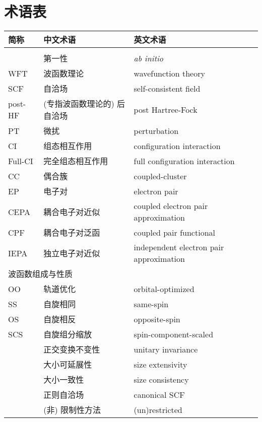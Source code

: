 
\chapter{术语表}

\begingroup
\setlength{\LTleft}{-20cm plus -1fill}
\setlength{\LTright}{\LTleft}

\begin{longtable}{lll}
    \toprule 简称 & 中文术语 & 英文术语 \\ \midrule \endhead
    \bottomrule \endlastfoot
    \multicolumn{3}{l}{\textsf{波函数理论}} \\
    & 第一性 & \emph{ab initio} \\
    WFT & 波函数理论 & wavefunction theory \\
    SCF & 自洽场 & self-consistent field \\
    post-HF & (专指波函数理论的) 后自洽场 & post Hartree-Fock \\
    PT & 微扰 & perturbation \\
    CI & 组态相互作用 & configuration interaction \\
    Full-CI & 完全组态相互作用 & full configuration interaction \\
    CC & 偶合簇 & coupled-cluster \\
    EP & 电子对 & electron pair \\
    CEPA & 耦合电子对近似 & coupled electron pair approximation \\
    CPF & 耦合电子对泛函 & coupled pair functional \\
    IEPA & 独立电子对近似 & independent electron pair approximation \\
    \midrule
    \multicolumn{3}{l}{\textsf{波函数组成与性质}} \\
    OO & 轨道优化 & orbital-optimized \\
    SS & 自旋相同 & same-spin \\
    OS & 自旋相反 & opposite-spin \\
    SCS & 自旋组分缩放 & spin-component-scaled \\
    & 正交变换不变性 & unitary invariance \\
    & 大小可延展性 & size extensivity \\
    & 大小一致性 & size consistency \\
    & 正则自洽场 & canonical SCF \\
    & (非) 限制性方法 & (un)restricted \\

\end{longtable}
